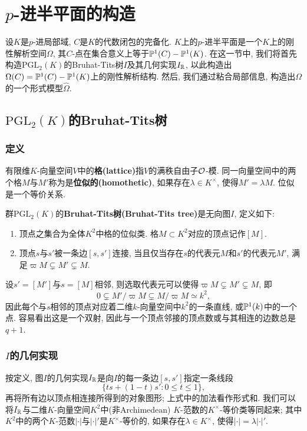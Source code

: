 \section{$p$-进半平面的构造}

设$K$是$p$-进局部域, $C$是$K$的代数闭包的完备化.
$K$上的$p$-进半平面是一个$K$上的刚性解析空间$\Omega$,
其$C$-点在集合意义上等于$\P^1(C)-\P^1(K)$.
在这一节中, 我们将首先构造$\mathrm{PGL}_2(K)$的Bruhat-Tits树$I$及其几何实现$I_\R$, 以此构造出$\Omega(C) = \P^1(C) - \P^1(K)$上的刚性解析结构.
然后, 我们通过粘合局部信息, 构造出$\Omega$的一个形式模型$\hat{\Omega}$.

\subsection{$\mathrm{PGL}_2(K)$的Bruhat-Tits树}

\subsubsection{定义}
有限维$K$-向量空间$V$中的\textbf{格(lattice)}指$V$的满秩自由子$\O$-模.
同一向量空间中的两个格$M$与$M'$称为是\textbf{位似的(homothetic)}, 如果存在$\lambda\in K^\times$, 使得$M' = \lambda M$.
位似是一个等价关系.
\begin{definition}
    群$\mathrm{PGL}_2(K)$的\textbf{Bruhat-Tits树(Bruhat-Tits tree)}是无向图$I$, 定义如下:
    \begin{enumerate}
        \item [\myit] 顶点之集合为全体$K^2$中格的位似类. 格$M\subset K^2$对应的顶点记作$[M]$.
        \item [\myit] 顶点$s$与$s'$被一条边$[s, s']$连接, 当且仅当存在$s$的代表元$M$和$s'$的代表元$M'$, 满足$\varpi M \subsetneq M'\subsetneq M$.
    \end{enumerate}
\end{definition}

设$s' = [M']$与$s = [M]$相邻, 则选取代表元可以使得$\varpi M\subsetneq M' \subsetneq M$,
即\[0\subsetneq M'/\varpi M\subsetneq M/\varpi M\simeq k^2,\]
因此每个与$s$相邻的顶点对应着二维$k$-向量空间中$k^2$的一条直线,
或$\P^1(k)$中的一个点. 容易看出这是一个双射, 因此与一个顶点邻接的顶点数或与其相连的边数总是$q+1$.


\subsubsection{$I$的几何实现}
按定义, 图$I$的几何实现$I_\R$是向$I$的每一条边$[s, s']$指定一条线段\[\{ts + (1-t)s' : 0\le t\le 1\},\]
再将所有边以顶点相连接所得到的对象图形; 上式中的加法看作形式和.
我们可以将$I_\R$与二维$K$-向量空间$K^2$中(非Archimedean) $K$-范数的$K^\times$-等价类等同起来;
其中$K^2$中的两个$K$-范数$|\cdot|$与$|\cdot|'$是$K^\times$-等价的, 如果存在$\lambda\in K^\times$, 使得$|\cdot| = \lambda|\cdot|'$.

